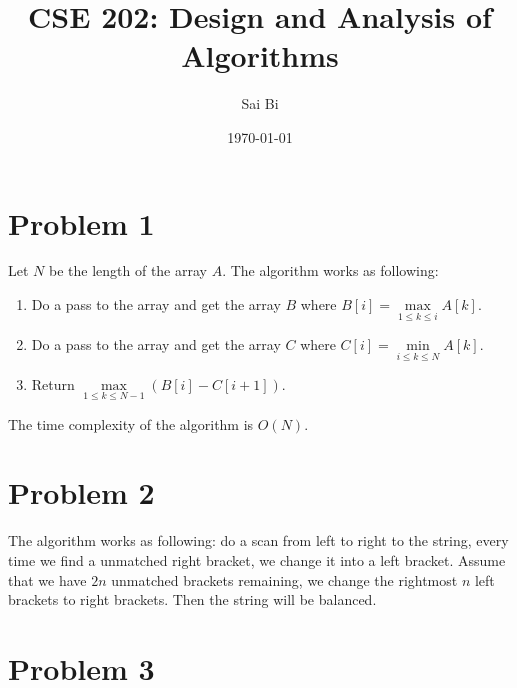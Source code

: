 \documentclass[a4paper,11pt]{article}
\theoremstyle{mytheor}
\begin{document}
\title{CSE 202: Design and Analysis of Algorithms}

\author{Sai Bi}

\date{\today}

\maketitle

\section*{Problem 1}
Let $N$ be the length of the array $A$. The algorithm works as following:
\begin{enumerate}
\item
Do a pass to the array and get the array $B$ where $B[i]=\max\limits_{1\leq k \leq i} A[k]$.
\item 
Do a pass to the array and get the array $C$ where $C[i]=\min\limits_{i\leq k \leq N} A[k]$.
\item
Return $\max\limits_{1\leq k \leq N-1} (B[i] - C[i+1])$.
\end{enumerate}
The time complexity of the algorithm is $O(N)$.

\section*{Problem 2}
The algorithm works as following: do a scan from left to right to the string, every time we find
a unmatched right bracket, we change it into a left bracket. Assume that we have $2n$ unmatched 
brackets remaining, we change the rightmost $n$ left brackets to right brackets. Then the string
will be balanced.


\section*{Problem 3}
\end{document}
